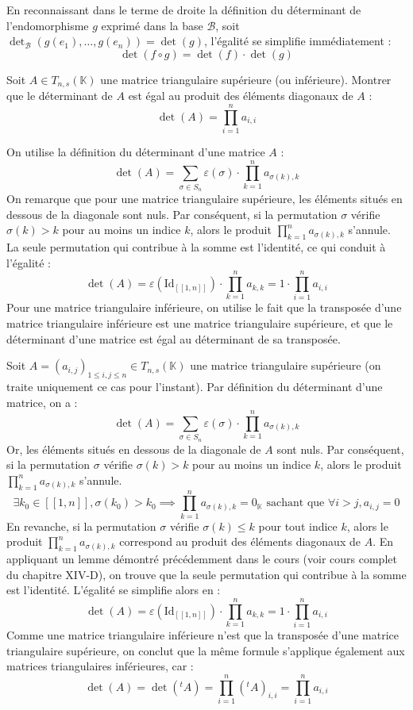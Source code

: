 \documentclass[11pt, a4paper]{article}
\theoremstyle{definition}
\begin{document}
En reconnaissant dans le terme de droite la définition du déterminant de l'endomorphisme $g$ exprimé dans la base $\mathcal{B}$, soit $\det_{\mathcal{B}}(g(e_1), \dots, g(e_n)) = \det(g)$, l'égalité se simplifie immédiatement :
$$\det(f \circ g) = \det(f) \cdot \det(g)$$

\clearpage

\begin{tcolorbox}[instructionstyle]
	Soit $A \in T_{n,s}(\mathbb{K})$ une matrice triangulaire supérieure (ou inférieure). Montrer que le déterminant de $A$ est égal au produit des éléments diagonaux de $A$ :
	$$\det(A) = \prod_{i=1}^{n} a_{i,i}$$
\end{tcolorbox}

\begin{tcolorbox}[methodstyle]
	On utilise la définition du déterminant d'une matrice $A$ :
	$$\det(A) = \sum_{\sigma \in S_n} \varepsilon(\sigma) \cdot \prod_{k=1}^{n} a_{\sigma(k), k}$$
	On remarque que pour une matrice triangulaire supérieure, les éléments situés en dessous de la
	diagonale sont nuls. Par conséquent, si la permutation $\sigma$ vérifie $\sigma(k) > k$ pour au moins un indice $k$, alors le produit $\prod_{k=1}^{n} a_{\sigma(k), k}$ s'annule. La seule permutation qui contribue à la somme est l'identité, ce qui conduit à l'égalité :
	$$\det(A) = \varepsilon(\mathrm{Id}_{[\![1,n]\!]}) \cdot \prod_{k=1}^{n} a_{k,k} = 1 \cdot \prod_{i=1}^{n} a_{i,i}$$
	Pour une matrice triangulaire inférieure, on utilise le fait que la transposée d'une matrice triangulaire inférieure est une matrice triangulaire supérieure, et que le déterminant d'une matrice est égal au déterminant de sa transposée.
\end{tcolorbox}

Soit $A = (a_{i,j})_{1 \le i,j \le n} \in T_{n,s}(\mathbb{K})$ une matrice triangulaire supérieure (on traite uniquement ce cas pour l'instant). Par définition du déterminant d'une matrice, on a :
$$\det(A) = \sum_{\sigma \in S_n} \varepsilon(\sigma) \cdot \prod_{k=1}^{n} a_{\sigma(k), k}$$
Or, les éléments situés en dessous de la diagonale de $A$ sont nuls. Par conséquent, si la permutation $\sigma$ vérifie $\sigma(k) > k$ pour au moins un indice $k$, alors le produit $\prod_{k=1}^{n} a_{\sigma(k), k}$ s'annule.
$$\exists k_0 \in [\![1,n]\!], \sigma(k_0) > k_0 \implies \prod_{k=1}^{n} a_{\sigma(k), k} = 0_\mathbb{K} \text{ sachant que } \forall i > j, a_{i,j} = 0$$ 
En revanche, si la permutation $\sigma$ vérifie $\sigma(k) \le k$ pour tout indice $k$, alors le produit $\prod_{k=1}^{n} a_{\sigma(k), k}$ correspond au produit des éléments diagonaux de $A$. 
En appliquant un lemme démontré précédemment dans le cours (voir cours complet du chapitre XIV-D), on trouve que la seule permutation qui contribue à la somme est l'identité. L'égalité se simplifie alors en :
$$\det(A) = \varepsilon(\mathrm{Id}_{[\![1,n]\!]}) \cdot \prod_{k=1}^{n} a_{k,k} = 1 \cdot \prod_{i=1}^{n} a_{i,i}$$
Comme une matrice triangulaire inférieure n'est que la transposée d'une matrice triangulaire supérieure, on conclut que la même formule s'applique également aux matrices triangulaires inférieures, car :
$$\det(A) = \det(^t A) = \prod_{i=1}^{n} ({}^t A)_{i,i} = \prod_{i=1}^{n} a_{i,i}$$
\end{document}
